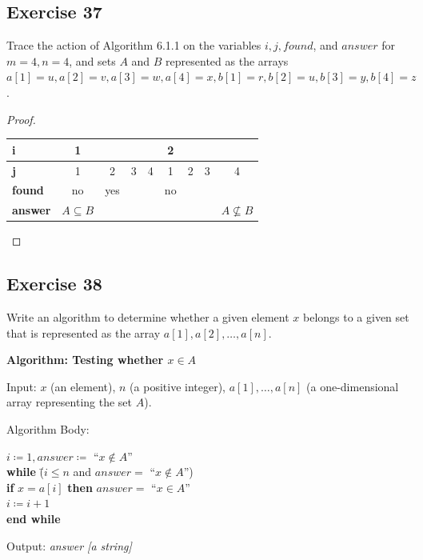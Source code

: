 \documentclass[14pt]{extarticle}
\newcommand{\cy}{\color{cyan}}
\begin{document}
\subsection{Exercise 37}
Trace the action of Algorithm 6.1.1 on the variables $i, j, found$, and $answer$ for $m = 4, n = 4$, and sets $A$ and 
$B$ represented as the arrays \(a[1] = u, a[2] = v, a[3] = w, a[4] = x, b[1] = r, b[2] = u, b[3] = y, b[4] = z\).

\begin{proof}
\begin{center}
\begin{tabular}{|l|c|c|c|c|c|c|c|c|}
\hline
{\bf i} & 1 & & & & 2 & & & \\
\hline
{\bf j} & 1 & 2 & 3 & 4 & 1 & 2 & 3 & 4 \\
\hline
{\bf found} & no & yes & & & no & & & \\
\hline
{\bf answer} & \(A \subseteq B\) & & & & & & & \(A \nsubseteq B\) \\
\hline
\end{tabular}
\end{center}
\end{proof}

\subsection{Exercise 38}
Write an algorithm to determine whether a given element $x$ belongs to a given set that is represented as the array 
\(a[1], a[2], \ldots, a[n]\).

\begin{tcolorbox}[colframe=cyan]
{\bf \cy Algorithm: Testing whether $x \in A$} 

{\cy Input:} $x$ (an element), $n$ (a positive integer), \(a[1], \ldots, a[n]\) (a one-dimensional array representing 
the set $A$).

{\cy Algorithm Body:}
\begin{tabbing}
\(i \coloneqq 1, answer \coloneqq\) ``\(x \notin A\)'' \\
{\bf while} \= (\(i \leq n\) and \(answer =\) ``\(x \notin A\)'') \\
            \> {\bf if} \(x = a[i]\) {\bf then} \(answer = \) ``\(x \in A\)'' \\
            \> \(i \coloneqq i + 1\) \\
{\bf end while}
\end{tabbing}
{\cy Output:} {\it answer [a string]}
\end{tcolorbox}
\end{document}
